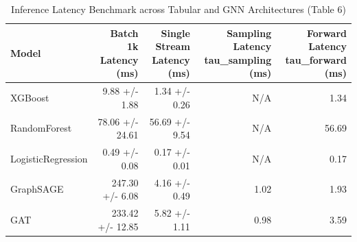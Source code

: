 \begin{table}
\caption{Inference Latency Benchmark across Tabular and GNN Architectures (Table 6)}
\label{tab:latency_benchmark}
\begin{tabular}{lrrrr}
\toprule
Model & Batch 1k Latency (ms) & Single Stream Latency (ms) & Sampling Latency tau_sampling (ms) & Forward Latency tau_forward (ms) \\
\midrule
XGBoost & 9.88 +/- 1.88 & 1.34 +/- 0.26 & N/A & 1.34 \\
RandomForest & 78.06 +/- 24.61 & 56.69 +/- 9.54 & N/A & 56.69 \\
LogisticRegression & 0.49 +/- 0.08 & 0.17 +/- 0.01 & N/A & 0.17 \\
GraphSAGE & 247.30 +/- 6.08 & 4.16 +/- 0.49 & 1.02 & 1.93 \\
GAT & 233.42 +/- 12.85 & 5.82 +/- 1.11 & 0.98 & 3.59 \\
\bottomrule
\end{tabular}
\end{table}
